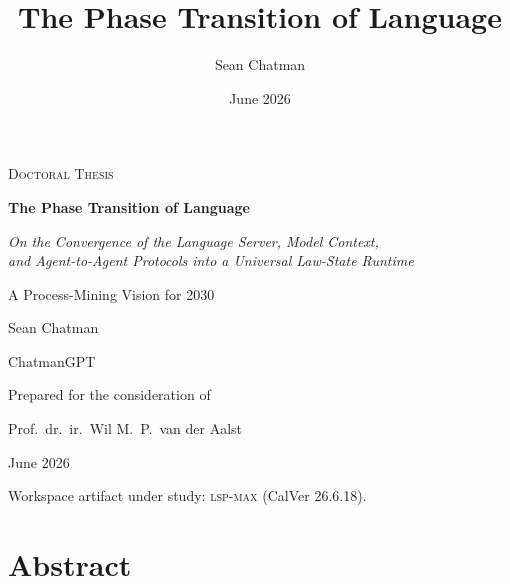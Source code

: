 \documentclass[11pt,a4paper,oneside]{report}
\title{The Phase Transition of Language}
\author{Sean Chatman}
\date{June 2026}
\theoremstyle{plain}
\theoremstyle{definition}
\theoremstyle{remark}
\newcommand{\lspmax}{\mbox{\textsc{lsp-max}}}
\begin{document}


\begin{titlepage}
  \centering
  \vspace*{1.2cm}
  {\scshape\large Doctoral Thesis\par}
  \vspace{1.0cm}
  {\Huge\bfseries The Phase Transition of Language\par}
  \vspace{0.9cm}
  {\large\itshape On the Convergence of the Language Server, Model Context,\\
   and Agent-to-Agent Protocols into a Universal Law-State Runtime\par}
  \vspace{0.4cm}
  {\large A Process-Mining Vision for 2030\par}
  \vspace{1.6cm}
  {\large Sean Chatman\par}
  \vspace{0.4cm}
  {\normalsize ChatmanGPT\par}
  \vfill
  {\normalsize Prepared for the consideration of\par}
  \vspace{0.2cm}
  {\large Prof.\ dr.\ ir.\ Wil M.\ P.\ van der Aalst\par}
  \vspace{1.2cm}
  {\normalsize June 2026\par}
  \vspace{0.6cm}
  {\footnotesize Workspace artifact under study: \lspmax{} (CalVer 26.6.18).\par}
\end{titlepage}

\chapter*{Abstract}
\end{document}
